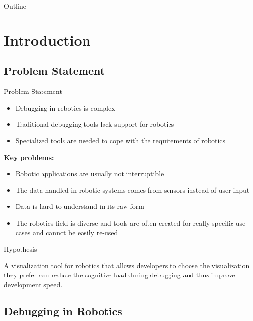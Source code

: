 \documentclass[compress]{beamer}
\title[Visual Debugging for Robotics]
{A flexible visual framework\\ \strut for debugging complex robotic systems}
\subtitle{\scriptsize{Masters's Thesis in the Software Engineering Elite Graduate Program}}
\author[Felix Kaser]{Felix Kaser\\\tiny{\texttt{kaserf@in.tum.de}}}
\date{October 3, 2012}
\begin{document}
\begin{frame}[plain]
\titlepage
\end{frame}

\begin{frame}{Outline}
\tableofcontents
\end{frame}

\section{Introduction}
\subsection{Problem Statement}

\begin{frame}{Problem Statement}
\begin{itemize}
\item Debugging in robotics is complex
\item Traditional debugging tools lack support for robotics
\item Specialized tools are needed to cope with the requirements of robotics
\end{itemize}
\pause
\textbf{Key problems:}
\begin{itemize}
\item Robotic applications are usually not interruptible
\item The data handled in robotic systems comes from sensors instead of user-input
\item Data is hard to understand in its raw form
\item The robotics field is diverse and tools are often created for really specific use cases and cannot be easily re-used
\end{itemize}
\end{frame}

\begin{frame}{Hypothesis}
\begin{block}{}
A visualization tool for robotics that allows developers to choose the visualization they prefer can reduce the cognitive load during debugging and thus improve development speed.
\end{block}
\end{frame}

\subsection{Debugging in Robotics}
\end{document}
